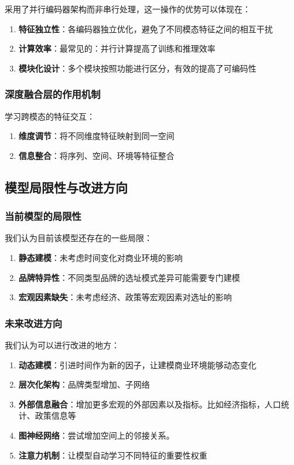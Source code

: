 \documentclass{article}
\begin{document}
采用了并行编码器架构而非串行处理，这一操作的优势可以体现在：

\begin{enumerate}
\item \textbf{特征独立性}：各编码器独立优化，避免了不同模态特征之间的相互干扰
\item \textbf{计算效率}：最常见的：并行计算提高了训练和推理效率
\item \textbf{模块化设计}：多个模块按照功能进行区分，有效的提高了可编码性
\end{enumerate}

\subsubsection{深度融合层的作用机制}

学习跨模态的特征交互：

\begin{enumerate}
\item \textbf{维度调节}：将不同维度特征映射到同一空间
\item \textbf{信息整合}：将序列、空间、环境等特征整合
\end{enumerate}

\subsection{模型局限性与改进方向}

\subsubsection{当前模型的局限性}

我们认为目前该模型还存在的一些局限：

\begin{enumerate}
\item \textbf{静态建模}：未考虑时间变化对商业环境的影响
\item \textbf{品牌特异性}：不同类型品牌的选址模式差异可能需要专门建模
\item \textbf{宏观因素缺失}：未考虑经济、政策等宏观因素对选址的影响
\end{enumerate}

\subsubsection{未来改进方向}

我们认为可以进行改进的地方：

\begin{enumerate}
\item \textbf{动态建模}：引进时间作为新的因子，让建模商业环境能够动态变化
\item \textbf{层次化架构}：品牌类型增加、子网络
\item \textbf{外部信息融合}：增加更多宏观的外部因素以及指标。比如经济指标，人口统计、政策信息等
\item \textbf{图神经网络}：尝试增加空间上的邻接关系。
\item \textbf{注意力机制}：让模型自动学习不同特征的重要性权重
\end{enumerate}
\end{document}
